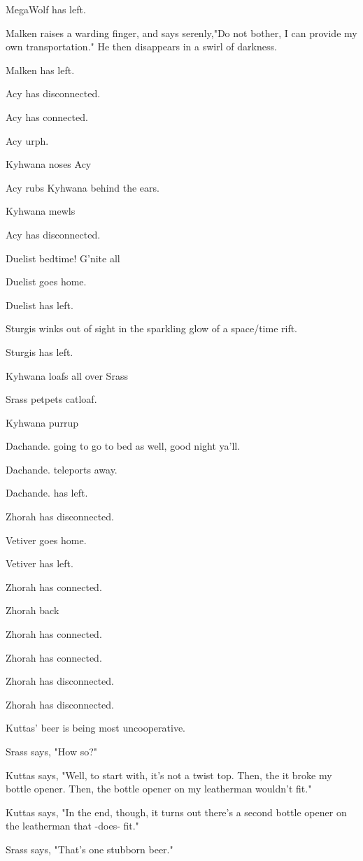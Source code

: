 \begin{hangparas}{2em}{1}
MegaWolf has left.

Malken raises a warding finger, and says serenly,"Do not bother, I can provide my own transportation."  He then disappears in a swirl of darkness.

Malken has left.

Acy has disconnected.

Acy has connected.

Acy urph.

Kyhwana noses Acy

Acy rubs Kyhwana behind the ears.

Kyhwana mewls

Acy has disconnected.

Duelist bedtime! G'nite all

Duelist goes home.

Duelist has left.

Sturgis winks out of sight in the sparkling glow of a space/time rift.

Sturgis has left.

Kyhwana loafs all over Srass

Srass petpets catloaf.

Kyhwana purrup

Dachande. going to go to bed as well, good night ya'll.

Dachande. teleports away.

Dachande. has left.

Zhorah has disconnected.

Vetiver goes home.

Vetiver has left.

Zhorah has connected.

Zhorah back

Zhorah has connected.

Zhorah has connected.

Zhorah has disconnected.

Zhorah has disconnected.

Kuttas' beer is being most uncooperative.

Srass says, "How so?"

Kuttas says, "Well, to start with, it's not a twist top. Then, the it broke my bottle opener. Then, the bottle opener on my leatherman wouldn't fit."

Kuttas says, "In the end, though, it turns out there's a second bottle opener on the leatherman that -does- fit."

Srass says, "That's one stubborn beer."


\end{hangparas}

